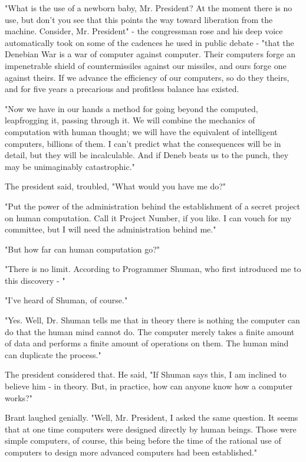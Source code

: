 \documentclass{amsart}
\begin{document}
"What is the use of a newborn baby, Mr. President? At the moment there
is no use, but don't you see that this points the way toward
liberation from the machine. Consider, Mr. President" - the
congressman rose and his deep voice automatically took on some of the
cadences he used in public debate - "that the Denebian War is a war of
computer against computer. Their computers forge an impenetrable
shield of countermissiles against our missiles, and ours forge one
against theirs. If we advance the efficiency of our computers, so do
they theirs, and for five years a precarious and profitless balance
has existed.

"Now we have in our hands a method for going beyond the computed,
leapfrogging it, passing through it. We will combine the mechanics of
computation with human thought; we will have the equivalent of
intelligent computers, billions of them. I can't predict what the
consequences will be in detail, but they will be incalculable. And if
Deneb beats us to the punch, they may be unimaginably catastrophic."

The president said, troubled, "What would you have me do?"

"Put the power of the administration behind the establishment of a
secret project on human computation. Call it Project Number, if you
like. I can vouch for my committee, but I will need the administration
behind me."

"But how far can human computation go?"

"There is no limit. According to Programmer Shuman, who first
introduced me to this discovery - "

"I've heard of Shuman, of course."

"Yes. Well, Dr. Shuman tells me that in theory there is nothing the
computer can do that the human mind cannot do. The computer merely
takes a finite amount of data and performs a finite amount of
operations on them. The human mind can duplicate the process."

The president considered that. He said, "If Shuman says this, I am
inclined to believe him - in theory. But, in practice, how can anyone
know how a computer works?"

Brant laughed genially. "Well, Mr. President, I asked the same
question. It seems that at one time computers were designed directly
by human beings. Those were simple computers, of course, this being
before the time of the rational use of computers to design more
advanced computers had been established."
\end{document}
